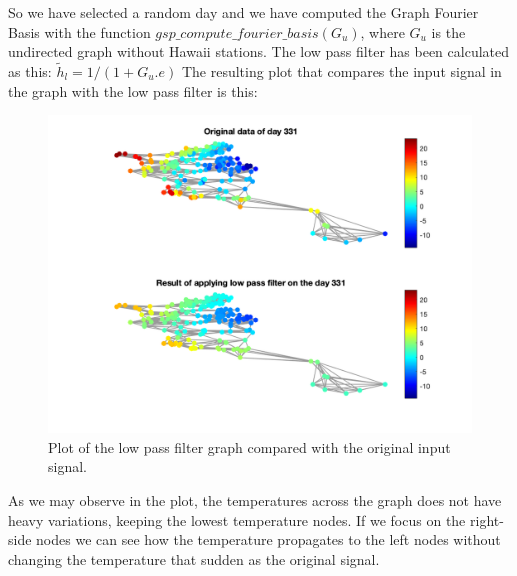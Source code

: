 \documentclass[12pt]{article}
\begin{document}
So we have selected a random day and we have computed the Graph Fourier Basis with the function $gsp\_compute\_fourier\_basis(G_u)$, where $G_u$ is the undirected graph without Hawaii stations.
The low pass filter has been calculated as this: $\tilde{h}_l= 1/(1+G_u.e)$
The resulting plot that compares the input signal in the graph with the low pass filter is this:
\begin{figure}[H]
	\centering
	\includegraphics[width=13cm]{images/5.png}
	\caption{Plot of the low pass filter graph compared with the original input signal.}
	\label{fig:lowpassfilterrandom}
\end{figure}

As we may observe in the plot, the temperatures across the graph does not have heavy variations, keeping the lowest temperature nodes. If we focus on the right-side nodes we can see how the temperature propagates to the left nodes without changing the temperature that sudden as the original signal.
\end{document}
